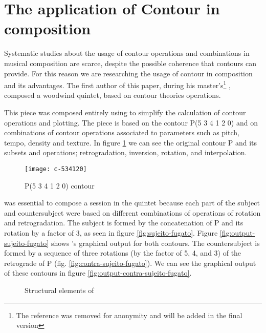 \section{The application of Contour in composition}
\label{sec:cont-appl-comp}

Systematic studies about the usage of contour operations and
combinations in musical composition are scarce, despite the possible
coherence that contours can provide. For this reason we are
researching the usage of contour in composition and its advantages.
The first author of this paper, during his master's\footnote{The
  reference was removed for anonymity and will be added in the final
  version}
, composed a woodwind quintet, 
based on contour theories operations.

This piece
was composed entirely using \goiaba{} to simplify the calculation of
contour operations and plotting. The piece is based on the contour P(5
3 4 1 2 0) and on combinations of contour operations associated to
parameters such as pitch, tempo, density and texture. In figure
\ref{fig:c-534120} we can see the original contour P and its subsets
and operations; retrogradation, inversion, rotation, and
interpolation.

\begin{figure}
  \centering
  \texttt{[image: c-534120]}
  \caption{P(5 3 4 1 2 0) contour}
  \label{fig:c-534120}
\end{figure}

\goiaba{} was essential to compose a  session in the
quintet because each part of the subject and countersubject were based
on different combinations of operations of rotation and
retrogradation. The subject is formed by the concatenation of P and
its rotation by a factor of 3, as seen in figure
\ref{fig:sujeito-fugato}. Figure \ref{fig:output-sujeito-fugato} shows
\goiaba{}'s graphical output for both contours. The countersubject is
formed by a sequence of three rotations (by the factor of 5, 4, and 3)
of the retrograde of P (fig. \ref{fig:contra-sujeito-fugato}). We can
see the graphical output of these contours in figure
\ref{fig:output-contra-sujeito-fugato}.

\begin{figure*}
  \centering

  \caption{Structural elements of }
  \label{fig:elementos-fugato}
\end{figure*}

